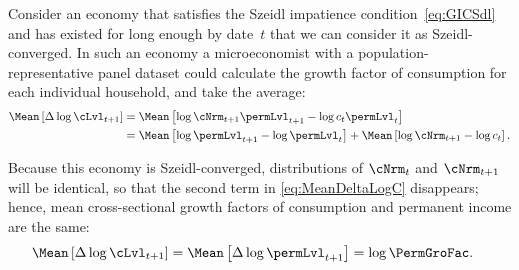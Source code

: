 \documentclass[BufferStockTheory]{subfiles}
\begin{document}
Consider an economy that satisfies the Szeidl impatience condition~\eqref{eq:GICSdl} and has existed for long enough by date~$t$ that we can consider it as Szeidl-converged.
In such an economy a microeconomist with a population-representative panel dataset could calculate the growth factor of consumption for each individual household, and take the average:
\begin{equation}\label{eq:MeanDeltaLogC}
  \begin{aligned}
    \Mean\left[\Delta \log \cLvl_{t+1}\right]  & = \Mean\left[ \log {\cNrm}_{t+1}\permLvl_{t+1} - \log c_{t}\permLvl_{t}\right]  \\
    & = \Mean\left[ \log \permLvl_{t+1}- \log \permLvl_{t}\right] + \Mean\left[ \log {\cNrm}_{t+1} - \log c_{t}\right].
  \end{aligned}
\end{equation}

Because this economy is Szeidl-converged, distributions of $\cNrm_{t}$ and $\cNrm_{t+1}$ will be identical, so that the second term in  \eqref{eq:MeanDeltaLogC} disappears; hence, mean cross-sectional growth factors of consumption and permanent income are the same:
\begin{equation}\begin{gathered}\begin{aligned}
  \Mean\left[\Delta \log \cLvl_{t+1}\right]  & = \Mean\left[ \Delta \log \permLvl_{t+1}\right] = \log \PermGroFac \label{eq:MeanDeltaLogCeqMeanDeltaLogP}.
\end{aligned}\end{gathered}\end{equation}
\end{document}
